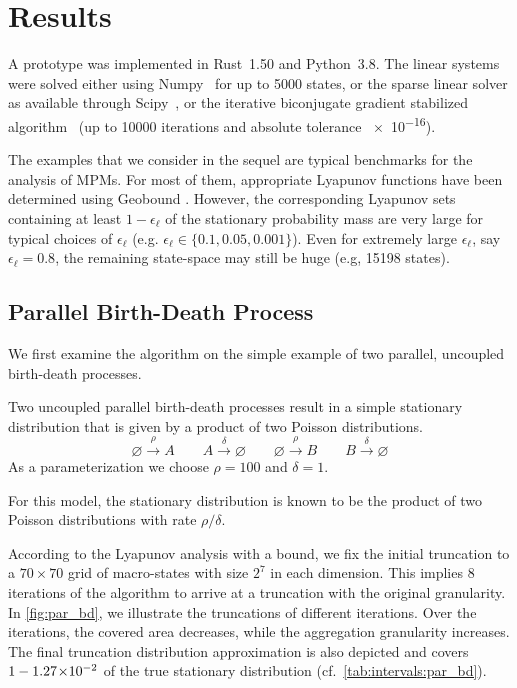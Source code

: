 \section{Results}\label{sec:statagg:results}
A prototype was implemented in Rust~1.50 and Python~3.8.
The linear systems were solved either using Numpy~\parencite{numpy} for up to \num{5000} states, or the sparse linear solver as available through Scipy~\parencite{2020SciPy-NMeth}, or the iterative biconjugate gradient stabilized algorithm~\parencite{van1992bi} (up to \num{10000} iterations and absolute tolerance \num{e-16}).

The examples that we consider in the sequel 
are typical benchmarks for the analysis of \acp{MPM}. For most of them, appropriate Lyapunov functions
have been determined using Geobound \parencite{geobound,spieler2014numerical}.
However, the corresponding Lyapunov sets containing at least $1-\epsilon_{\ell}$ of the stationary probability mass are very large for typical choices of $\epsilon_{\ell}$ (e.g. $\epsilon_{\ell}\in \{0.1,0.05,0.001\}$). Even
for extremely large $\epsilon_{\ell}$, say $\epsilon_{\ell}=0.8$, the remaining state-space may still be huge (e.g, \num{15198} states).
\subsection{Parallel Birth-Death Process}
We first examine the algorithm on the simple example of two parallel, uncoupled birth-death processes.
\begin{model}\label{model:par_bd}
Two uncoupled parallel birth-death processes result in a simple stationary distribution that is
given by a product of two Poisson distributions.
$$\varnothing\xrightarrow{\rho} A \qquad A\xrightarrow{\delta} \varnothing \qquad
\varnothing\xrightarrow{\rho} B \qquad B\xrightarrow{\delta} \varnothing$$
As a parameterization we choose $\rho = 100$ and $\delta=1$.
\end{model}
For this model, the stationary distribution is known to be the product of two Poisson distributions with rate $\rho / \delta$.

According to the Lyapunov analysis with a  bound, we fix the initial truncation to a $70\times 70$ grid of macro-states with size $2^7$ in each dimension.
This implies 8 iterations of the algorithm to arrive at a truncation with the original granularity.
In \autoref{fig:par_bd}, we illustrate the truncations of different iterations.
Over the iterations, the covered area decreases, while the aggregation granularity increases.
The final truncation distribution approximation is also depicted and covers $1 -  1.27\!\times\hspace{-.5ex} 10^{-2} $ of the true stationary distribution (cf.\ \autoref{tab:intervals:par_bd}).

